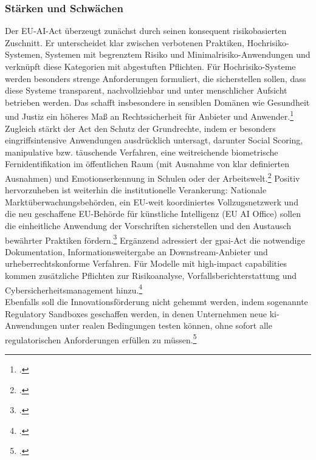 \subsubsection{Stärken und Schwächen}
\label{subsubsec:eu_stärken_schwächen}
Der EU-AI-Act überzeugt zunächst durch seinen konsequent risikobasierten Zuschnitt.
Er unterscheidet klar zwischen verbotenen Praktiken, Hochrisiko-Systemen, Systemen mit begrenztem Risiko und Minimalrisiko-Anwendungen und verknüpft diese Kategorien mit abgestuften Pflichten.
Für Hochrisiko-Systeme werden besonders strenge Anforderungen formuliert, die sicherstellen sollen, dass diese Systeme transparent, nachvollziehbar und unter menschlicher Aufsicht betrieben werden.
Das schafft insbesondere in sensiblen Domänen wie Gesundheit und Justiz ein höheres Maß an Rechtssicherheit für Anbieter und Anwender.\footcite[2-3]{europeanparliamentaryresearchserviceArtificialIntelligenceAct2024}
\\
Zugleich stärkt der Act den Schutz der Grundrechte, indem er besonders eingriffsintensive Anwendungen ausdrücklich untersagt, darunter Social Scoring, manipulative bzw. täuschende Verfahren, eine weitreichende biometrische Fernidentifikation im öffentlichen Raum (mit Ausnahme von klar definierten Ausnahmen) und Emotionserkennung in Schulen oder der Arbeitswelt.\footcite[5]{europeanparliamentaryresearchserviceArtificialIntelligenceAct2024}
Positiv hervorzuheben ist weiterhin die institutionelle Verankerung: Nationale Marktüberwachungsbehörden, ein EU-weit koordiniertes Vollzugsnetzwerk und die neu geschaffene EU-Behörde für künstliche Intelligenz (EU AI Office) sollen die einheitliche Anwendung der Vorschriften sicherstellen und den Austausch bewährter Praktiken fördern.\footcite[10-11]{europeanparliamentaryresearchserviceArtificialIntelligenceAct2024}
Ergänzend adressiert der \ac{gpai}-Act die notwendige Dokumentation, Informationsweitergabe an Downstream-Anbieter und urheberrechtskonforme Verfahren.
Für Modelle mit \glqq{}high-impact capabilities\grqq{} kommen zusätzliche Pflichten zur Risikoanalyse, Vorfallsberichterstattung und Cybersicherheitsmanagement hinzu.\footcite[10]{europeanparliamentaryresearchserviceArtificialIntelligenceAct2024}
\\
Ebenfalls soll die Innovationsförderung nicht gehemmt werden, indem sogenannte Regulatory Sandboxes geschaffen werden, in denen Unternehmen neue \ac{ki}-Anwendungen unter realen Bedingungen testen können, ohne sofort alle regulatorischen Anforderungen erfüllen zu müssen.\footcite[4;5]{europeanparliamentaryresearchserviceArtificialIntelligenceAct2024}
